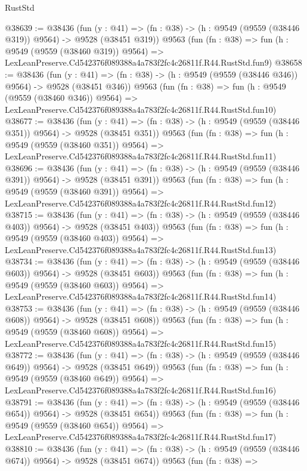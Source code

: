 \begin{lexlean}{RustStd}
\begin{coremodule}
@38639 := @38436
    (fun (y : @41) => (fn : @38) -> (h : @9549 (@9559 (@38446 @319)) @9564) -> @9528 (@38451 @319))
    @9563
    (fun (fn : @38) =>
    fun (h : @9549 (@9559 (@38460 @319)) @9564) =>
    LexLeanPreserve.Cd542376f089388a4a783f2fc4c26811f.R44.RustStd.fun9)
@38658 := @38436
    (fun (y : @41) => (fn : @38) -> (h : @9549 (@9559 (@38446 @346)) @9564) -> @9528 (@38451 @346))
    @9563
    (fun (fn : @38) =>
    fun (h : @9549 (@9559 (@38460 @346)) @9564) =>
    LexLeanPreserve.Cd542376f089388a4a783f2fc4c26811f.R44.RustStd.fun10)
@38677 := @38436
    (fun (y : @41) => (fn : @38) -> (h : @9549 (@9559 (@38446 @351)) @9564) -> @9528 (@38451 @351))
    @9563
    (fun (fn : @38) =>
    fun (h : @9549 (@9559 (@38460 @351)) @9564) =>
    LexLeanPreserve.Cd542376f089388a4a783f2fc4c26811f.R44.RustStd.fun11)
@38696 := @38436
    (fun (y : @41) => (fn : @38) -> (h : @9549 (@9559 (@38446 @391)) @9564) -> @9528 (@38451 @391))
    @9563
    (fun (fn : @38) =>
    fun (h : @9549 (@9559 (@38460 @391)) @9564) =>
    LexLeanPreserve.Cd542376f089388a4a783f2fc4c26811f.R44.RustStd.fun12)
@38715 := @38436
    (fun (y : @41) => (fn : @38) -> (h : @9549 (@9559 (@38446 @403)) @9564) -> @9528 (@38451 @403))
    @9563
    (fun (fn : @38) =>
    fun (h : @9549 (@9559 (@38460 @403)) @9564) =>
    LexLeanPreserve.Cd542376f089388a4a783f2fc4c26811f.R44.RustStd.fun13)
@38734 := @38436
    (fun (y : @41) => (fn : @38) -> (h : @9549 (@9559 (@38446 @603)) @9564) -> @9528 (@38451 @603))
    @9563
    (fun (fn : @38) =>
    fun (h : @9549 (@9559 (@38460 @603)) @9564) =>
    LexLeanPreserve.Cd542376f089388a4a783f2fc4c26811f.R44.RustStd.fun14)
@38753 := @38436
    (fun (y : @41) => (fn : @38) -> (h : @9549 (@9559 (@38446 @608)) @9564) -> @9528 (@38451 @608))
    @9563
    (fun (fn : @38) =>
    fun (h : @9549 (@9559 (@38460 @608)) @9564) =>
    LexLeanPreserve.Cd542376f089388a4a783f2fc4c26811f.R44.RustStd.fun15)
@38772 := @38436
    (fun (y : @41) => (fn : @38) -> (h : @9549 (@9559 (@38446 @649)) @9564) -> @9528 (@38451 @649))
    @9563
    (fun (fn : @38) =>
    fun (h : @9549 (@9559 (@38460 @649)) @9564) =>
    LexLeanPreserve.Cd542376f089388a4a783f2fc4c26811f.R44.RustStd.fun16)
@38791 := @38436
    (fun (y : @41) => (fn : @38) -> (h : @9549 (@9559 (@38446 @654)) @9564) -> @9528 (@38451 @654))
    @9563
    (fun (fn : @38) =>
    fun (h : @9549 (@9559 (@38460 @654)) @9564) =>
    LexLeanPreserve.Cd542376f089388a4a783f2fc4c26811f.R44.RustStd.fun17)
@38810 := @38436
    (fun (y : @41) => (fn : @38) -> (h : @9549 (@9559 (@38446 @674)) @9564) -> @9528 (@38451 @674))
    @9563
    (fun (fn : @38) =>

\end{coremodule}
\end{lexlean}
